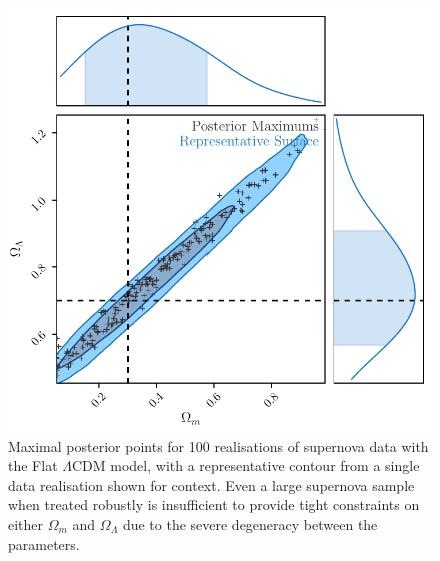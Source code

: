 \documentclass[a4paper,fleqn,usenatbib]{mnras}
\begin{document}
\begin{figure}
	\begin{center}
		\includegraphics[width=\columnwidth]{simpleApproximateModelOl.pdf}
	\end{center}
	\caption{Maximal posterior points for 100 realisations of supernova data with the Flat $\Lambda$CDM model, with a representative contour from a single data realisation shown for context. Even a large supernova sample when treated robustly is insufficient to provide tight constraints on either $\Omega_m$ and $\Omega_\Lambda$ due to the severe degeneracy between the parameters.}
	\label{fig:simple_ol}
\end{figure}
\end{document}
